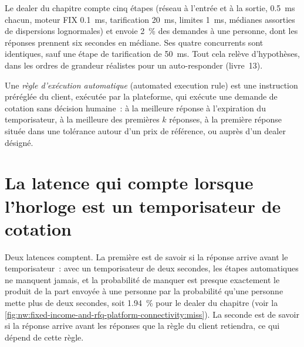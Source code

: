 \label{lst:nw:fixed-income-and-rfq-platform-connectivity:response}

Le dealer du chapitre compte cinq étapes (réseau à l'entrée et à la sortie, \qty{0.5}{\milli\second} chacun, moteur FIX \qty{0.1}{\milli\second},
tarification \qty{20}{\milli\second}, limites \qty{1}{\milli\second}, médianes assorties de dispersions lognormales) et envoie 2~\% des demandes à
une personne, dont les réponses prennent six secondes en médiane. Ses quatre concurrents sont identiques, sauf une étape de tarification de
\qty{50}{\milli\second}. Tout cela relève d'hypothèses, dans les ordres de grandeur réalistes pour un auto-responder (livre~13).

\begin{definition}\label{def:nw:fixed-income-and-rfq-platform-connectivity:rule}
Une \emph{règle d'exécution automatique} (automated execution rule) est une instruction préréglée du client, exécutée par la plateforme, qui
exécute une demande de cotation sans décision humaine~: à la meilleure réponse à l'expiration du temporisateur, à la meilleure des premières
$k$ réponses, à la première réponse située dans une tolérance autour d'un prix de référence, ou auprès d'un dealer désigné.
\end{definition}

\section{La latence qui compte lorsque l'horloge est un temporisateur de cotation}

Deux latences comptent. La première est de savoir si la réponse arrive avant le temporisateur~: avec un temporisateur de deux secondes, les étapes automatiques
ne manquent jamais, et la probabilité de manquer est presque exactement le produit de la part envoyée à une personne par la probabilité qu'une personne mette plus de deux secondes,
soit 1.94~\% pour le dealer du chapitre (voir la \cref{fig:nw:fixed-income-and-rfq-platform-connectivity:miss}). La seconde est de savoir si la réponse
arrive avant les réponses que la règle du client retiendra, ce qui dépend de cette règle.

